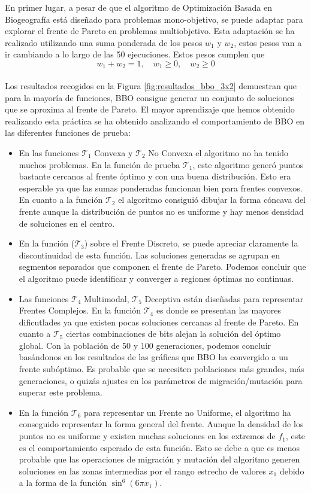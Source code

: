 \documentclass{article}
\begin{document}
En primer lugar, a pesar de que el algoritmo de Optimización Basada en Biogeografía está diseñado para problemas mono-objetivo, se puede adaptar para explorar el frente de Pareto en problemas multiobjetivo. Esta adaptación se ha realizado utilizando una suma ponderada de los pesos $w_1$ y $w_2$, estos pesos van a ir cambiando a lo largo de las 50 ejecuciones. Estos pesos cumplen que $$w_1 + w_2 = 1, \quad w_1 \ge 0, \quad w_2 \ge 0$$\\

Los resultados recogidos en la Figura \ref{fig:resultados_bbo_3x2} demuestran que para la mayoría de funciones, BBO consigue generar un conjunto de soluciones que se aproxima al frente de Pareto. El mayor aprendizaje que hemos obtenido realizando esta práctica se ha obtenido analizando el comportamiento de BBO en las diferentes funciones de prueba: \\
\begin{itemize}
    \item En las funciones $\mathcal{T}_1$ Convexa y $\mathcal{T}_2$ No Convexa el algoritmo no ha tenido muchos problemas. En la función de prueba $\mathcal{T}_1$, este algoritmo generó puntos bastante cercanos al frente óptimo y con una buena distribución. Esto era esperable ya que las sumas ponderadas funcionan bien para frentes convexos. En cuanto a la función $\mathcal{T}_2$ el algoritmo consiguió dibujar la forma cóncava del frente aunque la distribución de puntos no es uniforme y hay menos densidad de soluciones en el centro.
    \item En la función ($\mathcal{T}_3$) sobre el Frente Discreto, se puede apreciar claramente la discontinuidad de esta función. Las soluciones generadas se agrupan en segmentos separados que componen el frente de Pareto. Podemos concluir que el algoritmo puede identificar y converger a regiones óptimas no continuas.
    \item Las funciones $\mathcal{T}_4$ Multimodal, $\mathcal{T}_5$ Deceptiva están diseñadas para representar Frentes Complejos. En la función $\mathcal{T}_4$ es donde se presentan las mayores dificutlades ya que existen pocas soluciones cercanas al frente de Pareto. En cuanto a $\mathcal{T}_5$ ciertas combinaciones de bits alejan la solución del óptimo global. Con la población de 50 y 100 generaciones, podemos concluir basándonos en los resultados de las gráficas que BBO ha convergido a un frente subóptimo. Es probable que se necesiten poblaciones más grandes, más generaciones, o quizás ajustes en los parámetros de migración/mutación para superar este problema.
    \item En la función $\mathcal{T}_6$ para representar un Frente no Uniforme, el algoritmo ha conseguido representar la forma general del frente. Aunque la densidad de los puntos no es uniforme y existen muchas soluciones en los extremos de $f_1$, este es el comportamiento esperado de esta función. Esto se debe a que es menos probable que las operaciones de migración y mutación del algoritmo generen soluciones en las zonas intermedias por el rango estrecho de valores $x_1$ debido a la forma de la función $\sin^6(6\pi x_1)$.
\end{itemize}
\end{document}
